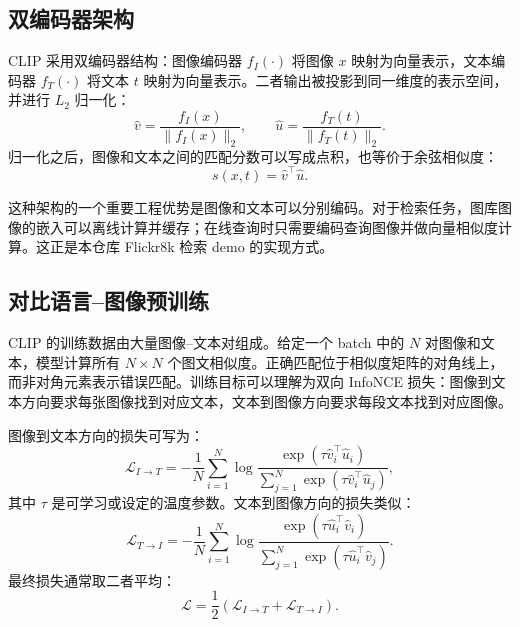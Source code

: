 \documentclass[UTF8,zihao=-4]{ctexart}
\begin{document}
\subsection{双编码器架构}

CLIP 采用双编码器结构：图像编码器 $f_I(\cdot)$ 将图像 $x$ 映射为向量表示，文本编码器 $f_T(\cdot)$ 将文本 $t$ 映射为向量表示。二者输出被投影到同一维度的表示空间，并进行 $L_2$ 归一化：
\begin{equation}
  \hat{v} = \frac{f_I(x)}{\|f_I(x)\|_2}, \qquad
  \hat{u} = \frac{f_T(t)}{\|f_T(t)\|_2}.
\end{equation}
归一化之后，图像和文本之间的匹配分数可以写成点积，也等价于余弦相似度：
\begin{equation}
  s(x,t) = \hat{v}^{\top}\hat{u}.
\end{equation}

这种架构的一个重要工程优势是图像和文本可以分别编码。对于检索任务，图库图像的嵌入可以离线计算并缓存；在线查询时只需要编码查询图像并做向量相似度计算。这正是本仓库 Flickr8k 检索 demo 的实现方式。

\subsection{对比语言--图像预训练}

CLIP 的训练数据由大量图像--文本对组成。给定一个 batch 中的 $N$ 对图像和文本，模型计算所有 $N \times N$ 个图文相似度。正确匹配位于相似度矩阵的对角线上，而非对角元素表示错误匹配。训练目标可以理解为双向 InfoNCE 损失：图像到文本方向要求每张图像找到对应文本，文本到图像方向要求每段文本找到对应图像。

图像到文本方向的损失可写为：
\begin{equation}
  \mathcal{L}_{I \rightarrow T}
  = - \frac{1}{N}\sum_{i=1}^{N}
  \log
  \frac{\exp(\tau \hat{v}_i^\top \hat{u}_i)}
  {\sum_{j=1}^{N}\exp(\tau \hat{v}_i^\top \hat{u}_j)},
\end{equation}
其中 $\tau$ 是可学习或设定的温度参数。文本到图像方向的损失类似：
\begin{equation}
  \mathcal{L}_{T \rightarrow I}
  = - \frac{1}{N}\sum_{i=1}^{N}
  \log
  \frac{\exp(\tau \hat{u}_i^\top \hat{v}_i)}
  {\sum_{j=1}^{N}\exp(\tau \hat{u}_i^\top \hat{v}_j)}.
\end{equation}
最终损失通常取二者平均：
\begin{equation}
  \mathcal{L} = \frac{1}{2}
  \left(\mathcal{L}_{I \rightarrow T} + \mathcal{L}_{T \rightarrow I}\right).
\end{equation}
\end{document}
